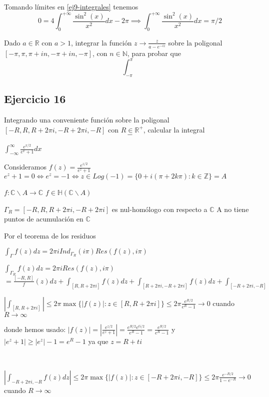 Tomando límites en \ref{ej9-integrales} tenemos
$$ 0=4\int_{0}^{+\infty} \frac{\sin^2(x)}{x^2} dx -2\pi  \implies  \int_{0}^{+\infty} \frac{\sin^2(x)}{x^2}dx = \pi/2 $$

\begin{ejer}
	Dado $a\in\mathbb{R}$ con $a>1$, integrar la función $z\rightarrow \frac{z}{a-e^{-iz}}$ sobre la poligonal $[-\pi,\pi,\pi+in,-\pi+in,-\pi]$, con $n\in\mathbb{N}$, para probar que
	$$ \int_{-\pi}^{\pi} $$
\end{ejer}

\subsection{Ejercicio 16}
\begin{ejer}
	Integrando una conveniente función sobre la poligonal $[-R,R,R+2\pi i,-R+2\pi i,-R]$ con $R\in\mathbb{R}^+$, calcular la integral
	$$ -$$
\end{ejer}

$\int_{-\infty}^{\infty} \frac{e^{x/2}}{e^x+1}dx$

Consideramos 
$f(z) = \frac{e^{z/2}}{e^z+1}$
$e^z+1=0 \Longleftrightarrow e^z = -1 \Longleftrightarrow z\in Log(-1) = \{ 0+i(\pi+2k\pi) : k\in\mathbb{Z} \} = A$

$f : \mathbb{C}\backslash A \rightarrow \mathbb{C}$
$f\in\mathbb{H}(\mathbb{C}\backslash A)$

$\Gamma_R  = [-R,R,R+2\pi i, -R+2\pi i]$ es nul-homólogo con respecto a $\mathbb{C}$
A no tiene puntos de acumulación en $\mathbb{C}$

Por el teorema de los residuos

$\int_{\Gamma} f(z)dz = 2\pi i Ind_{\Gamma_R}(i\pi) Res(f(z),i\pi)$

$\int_{\Gamma_R} f(z)dz = 2\pi i Res(f(z),i\pi)$
$= \frac{[-R,R]} f(z)dz + \int_{[R,R+2\pi i]} f(z)dz + \int_{[R+2\pi i, -R+2\pi i]} f(z)dz + \int_{[-R+2\pi i, -R]}$


$\left| \int_{[R,R+2\pi i]} \right| \leq 2\pi\max\{ |f(z)| : z\in [R,R+2\pi i] \} \leq 2\pi \frac{e^{R/2}}{e^R-1} \rightarrow 0$ cuando $R\rightarrow \infty$

donde hemos usado:
$|f(z)| = |\frac{e^{z/2}}{e^z+1}| = \frac{e^{R/2} e^{ti/2}}{e^R-1} = \frac{e^{R/2}}{e^R-1}$
y
$|e^z+1| \geq |e^z|-1 = e^R-1$ ya que $z=R+ti$


\

$\left| \int_{-R+2\pi i, -R} f(z)dz \right| \leq 2\pi \max \{ |f(z)| : z\in[-R+2\pi i, -R] \} \leq 2\pi \frac{e^{-R/2}}{1-e^{-R}} \rightarrow 0$ cuando $R\rightarrow\infty$

